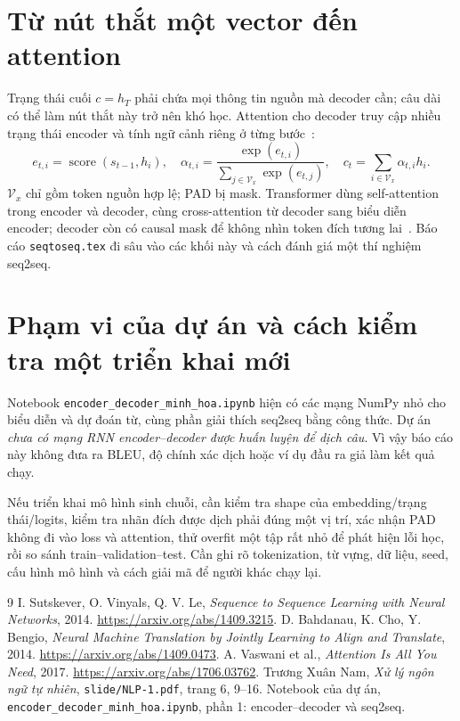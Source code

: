 \documentclass[11pt,a4paper]{article}
\begin{document}
\section{Từ nút thắt một vector đến attention}
Trạng thái cuối $c=h_T$ phải chứa mọi thông tin nguồn mà decoder cần; câu dài có thể làm nút thắt này trở nên khó học. Attention cho decoder truy cập nhiều trạng thái encoder và tính ngữ cảnh riêng ở từng bước~\cite{bahdanau2014}:
\begin{equation}
e_{t,i}=\operatorname{score}(s_{t-1},h_i),\quad
\alpha_{t,i}=\frac{\exp(e_{t,i})}{\sum_{j\in\mathcal V_x}\exp(e_{t,j})},\quad
c_t=\sum_{i\in\mathcal V_x}\alpha_{t,i}h_i.
\end{equation}
$\mathcal V_x$ chỉ gồm token nguồn hợp lệ; PAD bị mask. Transformer dùng self-attention trong encoder và decoder, cùng cross-attention từ decoder sang biểu diễn encoder; decoder còn có causal mask để không nhìn token đích tương lai~\cite{vaswani2017}. Báo cáo \texttt{seqtoseq.tex} đi sâu vào các khối này và cách đánh giá một thí nghiệm seq2seq.

\section{Phạm vi của dự án và cách kiểm tra một triển khai mới}
Notebook \texttt{encoder\_decoder\_minh\_hoa.ipynb} hiện có các mạng NumPy nhỏ cho biểu diễn và dự đoán từ, cùng phần giải thích seq2seq bằng công thức. Dự án \emph{chưa có mạng RNN encoder--decoder được huấn luyện để dịch câu}. Vì vậy báo cáo này không đưa ra BLEU, độ chính xác dịch hoặc ví dụ đầu ra giả làm kết quả chạy.

Nếu triển khai mô hình sinh chuỗi, cần kiểm tra shape của embedding/trạng thái/logits, kiểm tra nhãn đích được dịch phải đúng một vị trí, xác nhận PAD không đi vào loss và attention, thử overfit một tập rất nhỏ để phát hiện lỗi học, rồi so sánh train--validation--test. Cần ghi rõ tokenization, từ vựng, dữ liệu, seed, cấu hình mô hình và cách giải mã để người khác chạy lại.

\begin{thebibliography}{9}
 I. Sutskever, O. Vinyals, Q. V. Le, \emph{Sequence to Sequence Learning with Neural Networks}, 2014. \url{https://arxiv.org/abs/1409.3215}.
 D. Bahdanau, K. Cho, Y. Bengio, \emph{Neural Machine Translation by Jointly Learning to Align and Translate}, 2014. \url{https://arxiv.org/abs/1409.0473}.
 A. Vaswani et al., \emph{Attention Is All You Need}, 2017. \url{https://arxiv.org/abs/1706.03762}.
 Trương Xuân Nam, \emph{Xử lý ngôn ngữ tự nhiên}, \texttt{slide/NLP-1.pdf}, trang 6, 9--16.
 Notebook của dự án, \texttt{encoder\_decoder\_minh\_hoa.ipynb}, phần 1: encoder--decoder và seq2seq.
\end{thebibliography}
\end{document}
